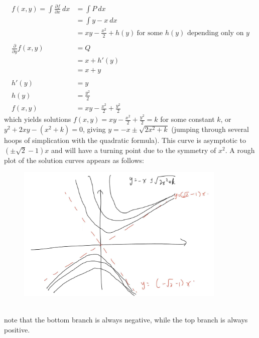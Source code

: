 \documentclass{article}
\begin{document}
\begin{equation*}
    \begin{aligned}
    f(x,y) = \int \frac{\partial f}{\partial x}\ dx &= \int P\ dx \\
    &= \int y-x\ dx \\
    &= xy - \frac{x^2}{2} + h(y)\ \text{for some $h(y)$ depending only on $y$} \\
    \\
    \frac{\partial}{\partial y} f(x,y) &= Q \\
    &= x + h'(y) \\
    &= x + y \\
    \\
    h'(y) &= y \\
    h(y) &= \frac{y^2}{2} \\
    f(x,y) &= xy - \frac{x^2}{2} + \frac{y^2}{2}
    \end{aligned}
    \end{equation*}
which yields solutions $f(x,y)=xy-\frac{x^2}{2}+\frac{y^2}{2}=k$ for some constant $k$, or $y^2 + 2xy - (x^2 + k) = 0$, giving $y = -x \pm \sqrt{2x^2 + k}$ (jumping through several hoops of simplication with the quadratic formula). This curve is asymptotic to $(\pm\sqrt{2}-1)x$ and will have a turning point due to the symmetry of $x^2$. A rough plot of the solution curves appears as follows:
\begin{figure}[h]
    \centering
    \includegraphics[width=10cm]{DE-ch2-9-3.jpg}
\end{figure}\\
note that the bottom branch is always negative, while the top branch is always positive.

\hrulefill
\end{document}
